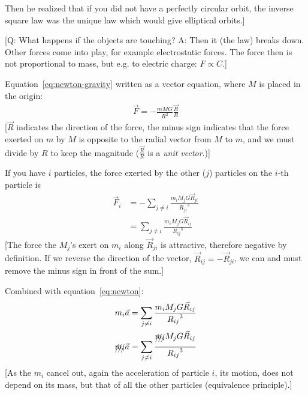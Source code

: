 \documentclass[pagesize,headsepline,10pt,parskip=half,BCOR=12mm]{scrreprt}
\newcommand{\eg}{\mbox{e.g.}\xspace}
\begin{document}
        Then he realized that if you did not have a perfectly
        circular orbit, the inverse square law was the unique law
        which would give elliptical orbits.]

        [Q: What happens if the objects are touching? A: Then it
        (the law) breaks down. Other forces come into play, for
        example electrostatic forces. The force then is not
        proportional to mass, but \eg to electric charge: $F
        \propto C$.]

        Equation~\ref{eq:newton-gravity} written as a vector
        equation, where $M$ is placed in the origin:
        \begin{align}\label{eq:newton-gravity-vector}
          \vec F = -\frac{mMG}{R^2} \frac{\vec R}{R}
        \end{align}
        [$\vec R$ indicates the direction of the force, the minus
        sign indicates that the force exerted on $m$ by $M$ is
        opposite to the radial vector from $M$ to $m$, and we must
        divide by $R$ to keep the magnitude ($\frac{\vec R}{R}$ is
        a \emph{unit vector}.)]

        If you have $i$ particles, the force exerted by the other
        ($j$) particles on the $i$-th particle is
        \begin{align}
          \vec F_i &= -\sum_{j \neq i}{\frac{m_i
          M_jG\vec R_{ji}}{{R_{ji}}^3}}\\
          &= \sum_{j \neq i}{\frac{m_i
          M_jG\vec R_{ij}}{{R_{ij}}^3}}
        \end{align}
        [The force the $M_j$'s exert on $m_i$ along $\vec R_{ji}$
        is attractive, therefore negative by definition. If we
        reverse the direction of the vector, $\vec R_{ij} = -\vec R_{ji}$, we can and must remove the minus sign in front of
        the sum.]

        Combined with equation~\ref{eq:newton}:
        \begin{align}\label{eq:newton-combined}
          m_i \vec a &= \sum_{j \neq i}{\frac{m_i
          M_jG\vec R_{ij}}{{R_{ij}}^3}} \\
          \xout{m_i} \vec a &= \sum_{j \neq i}{\frac{\xout{m_i}
          M_jG\vec R_{ij}}{{R_{ij}}^3}}
        \end{align}
        [As the $m_i$ cancel out, again the acceleration of
        particle $i$, its motion, does not depend on its mass, but
        that of all the other particles (equivalence principle).]
\end{document}
